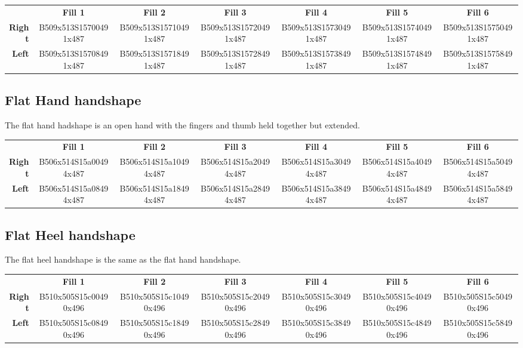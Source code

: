 \documentclass{article}
\begin{document}
\begin{center}
\begin{tabular}{r*{6}{c}}
&\textbf{Fill 1}&\textbf{Fill 2}&\textbf{Fill 3}&\textbf{Fill 4}&\textbf{Fill 5}&\textbf{Fill 6}\\
\textbf{Right}&
B509x513S15700491x487&
B509x513S15710491x487&
B509x513S15720491x487&
B509x513S15730491x487&
B509x513S15740491x487&
B509x513S15750491x487\\
\textbf{Left}&
B509x513S15708491x487&
B509x513S15718491x487&
B509x513S15728491x487&
B509x513S15738491x487&
B509x513S15748491x487&
B509x513S15758491x487\\
\end{tabular}
\end{center}

\subsection{Flat Hand handshape}

The flat hand hadshape is an open hand with the fingers and thumb held together but extended.

\begin{center}
\begin{tabular}{r*{6}{c}}
&\textbf{Fill 1}&\textbf{Fill 2}&\textbf{Fill 3}&\textbf{Fill 4}&\textbf{Fill 5}&\textbf{Fill 6}\\
\textbf{Right}&
B506x514S15a00494x487&
B506x514S15a10494x487&
B506x514S15a20494x487&
B506x514S15a30494x487&
B506x514S15a40494x487&
B506x514S15a50494x487\\
\textbf{Left}&
B506x514S15a08494x487&
B506x514S15a18494x487&
B506x514S15a28494x487&
B506x514S15a38494x487&
B506x514S15a48494x487&
B506x514S15a58494x487\\
\end{tabular}
\end{center}

\subsection{Flat Heel handshape}

The flat heel handshape is the same as the flat hand handshape.

\begin{center}
\begin{tabular}{r*{6}{c}}
&\textbf{Fill 1}&\textbf{Fill 2}&\textbf{Fill 3}&\textbf{Fill 4}&\textbf{Fill 5}&\textbf{Fill 6}\\
\textbf{Right}&
B510x505S15c00490x496&
B510x505S15c10490x496&
B510x505S15c20490x496&
B510x505S15c30490x496&
B510x505S15c40490x496&
B510x505S15c50490x496\\
\textbf{Left}&
B510x505S15c08490x496&
B510x505S15c18490x496&
B510x505S15c28490x496&
B510x505S15c38490x496&
B510x505S15c48490x496&
B510x505S15c58490x496\\
\end{tabular}
\end{center}
\end{document}

